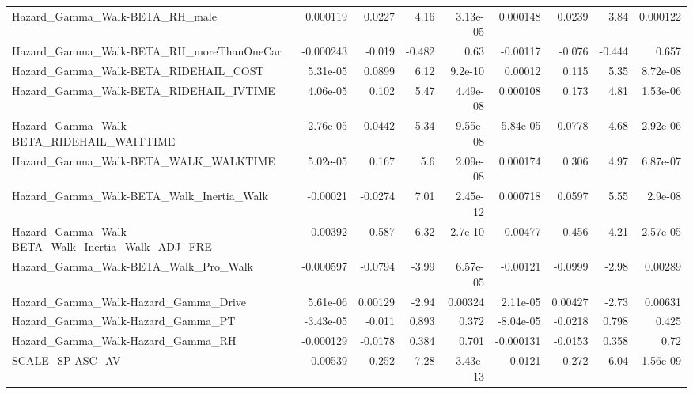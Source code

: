 \begin{tabular}{lrrrrrrrr}
Hazard\_Gamma\_Walk-BETA\_RH\_male                     &    0.000119 &       0.0227 &     4.16 & 3.13e-05 &   0.000148 &      0.0239 &         3.84 &      0.000122 \\
Hazard\_Gamma\_Walk-BETA\_RH\_moreThanOneCar           &   -0.000243 &       -0.019 &   -0.482 &     0.63 &   -0.00117 &      -0.076 &       -0.444 &         0.657 \\
Hazard\_Gamma\_Walk-BETA\_RIDEHAIL\_COST               &    5.31e-05 &       0.0899 &     6.12 &  9.2e-10 &    0.00012 &       0.115 &         5.35 &      8.72e-08 \\
Hazard\_Gamma\_Walk-BETA\_RIDEHAIL\_IVTIME             &    4.06e-05 &        0.102 &     5.47 & 4.49e-08 &   0.000108 &       0.173 &         4.81 &      1.53e-06 \\
Hazard\_Gamma\_Walk-BETA\_RIDEHAIL\_WAITTIME           &    2.76e-05 &       0.0442 &     5.34 & 9.55e-08 &   5.84e-05 &      0.0778 &         4.68 &      2.92e-06 \\
Hazard\_Gamma\_Walk-BETA\_WALK\_WALKTIME               &    5.02e-05 &        0.167 &      5.6 & 2.09e-08 &   0.000174 &       0.306 &         4.97 &      6.87e-07 \\
Hazard\_Gamma\_Walk-BETA\_Walk\_Inertia\_Walk           &    -0.00021 &      -0.0274 &     7.01 & 2.45e-12 &   0.000718 &      0.0597 &         5.55 &       2.9e-08 \\
Hazard\_Gamma\_Walk-BETA\_Walk\_Inertia\_Walk\_ADJ\_FRE   &     0.00392 &        0.587 &    -6.32 &  2.7e-10 &    0.00477 &       0.456 &        -4.21 &      2.57e-05 \\
Hazard\_Gamma\_Walk-BETA\_Walk\_Pro\_Walk               &   -0.000597 &      -0.0794 &    -3.99 & 6.57e-05 &   -0.00121 &     -0.0999 &        -2.98 &       0.00289 \\
Hazard\_Gamma\_Walk-Hazard\_Gamma\_Drive               &    5.61e-06 &      0.00129 &    -2.94 &  0.00324 &   2.11e-05 &     0.00427 &        -2.73 &       0.00631 \\
Hazard\_Gamma\_Walk-Hazard\_Gamma\_PT                  &   -3.43e-05 &       -0.011 &    0.893 &    0.372 &  -8.04e-05 &     -0.0218 &        0.798 &         0.425 \\
Hazard\_Gamma\_Walk-Hazard\_Gamma\_RH                  &   -0.000129 &      -0.0178 &    0.384 &    0.701 &  -0.000131 &     -0.0153 &        0.358 &          0.72 \\
SCALE\_SP-ASC\_AV                                    &     0.00539 &        0.252 &     7.28 & 3.43e-13 &     0.0121 &       0.272 &         6.04 &      1.56e-09 \\

\end{tabular}
